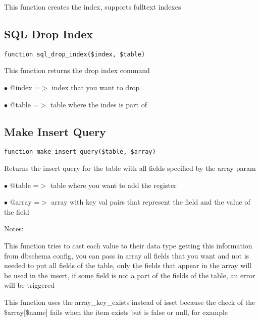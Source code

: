 \documentclass[a4paper]{book}
\begin{document}
This function creates the index, supports fulltext indexes

\hypertarget{toc242}{}
\subsection{SQL Drop Index}

\begin{lstlisting}
function sql_drop_index($index, $table)
\end{lstlisting}

This function returns the drop index command

\begin{compactitem}
\item[\color{myblue}$\bullet$] @index =$>$ index that you want to drop
\item[\color{myblue}$\bullet$] @table =$>$ table where the indes is part of
\end{compactitem}

\hypertarget{toc243}{}
\subsection{Make Insert Query}

\begin{lstlisting}
function make_insert_query($table, $array)
\end{lstlisting}

Returns the insert query for the table with all fields specified by the
array param

\begin{compactitem}
\item[\color{myblue}$\bullet$] @table =$>$ table where you want to add the register
\item[\color{myblue}$\bullet$] @array =$>$ array with key val pairs that represent the field and the value
          of the field
\end{compactitem}

Notes:

This function tries to cast each value to their data type getting this
information from dbschema config, you can pass in array all fields that
you want and not is needed to put all fields of the table, only the
fields that appear in the array will be used in the insert, if some
field is not a part of the fields of the table, an error will be
triggered

This function uses the array\_key\_exists instead of isset because the
check of the \$array[\$name] fails when the item exists but is false or
null, for example
\end{document}
